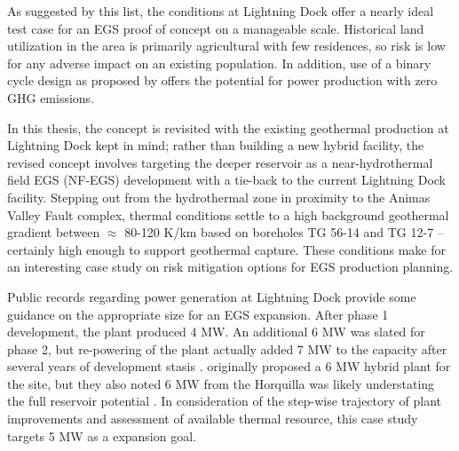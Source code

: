 As suggested by this list, the conditions at Lightning Dock offer a nearly ideal test case for an EGS proof of concept on a manageable scale. Historical land utilization in the area is primarily agricultural with few residences, so risk is low for any adverse impact on an existing population. In addition, use of a binary cycle design as proposed by \citet{schochet_development_2001} offers the potential for power production with zero GHG emissions.  

In this thesis, the \citeauthor{schochet_development_2001} concept is revisited with the existing geothermal production at Lightning Dock kept in mind; rather than building a new hybrid facility, the revised concept involves targeting the deeper reservoir as a near-hydrothermal field EGS (NF-EGS) development with a tie-back to the current Lightning Dock facility. Stepping out from the hydrothermal zone in proximity to the Animas Valley Fault complex, thermal conditions settle to a high background geothermal gradient between $\approx$ 80-120 K/km based on boreholes TG 56-14 and TG 12-7 \citep{cunniff_final_2003} -- certainly high enough to support geothermal capture. These conditions make for an interesting case study on risk mitigation options for EGS production planning.

Public records regarding power generation at Lightning Dock provide some guidance on the appropriate size for an EGS expansion. After phase 1 development, the plant produced 4 MW. An additional 6 MW was slated for phase 2, but re-powering of the plant actually added 7 MW to the capacity after several years of development stasis \citep{think_geoenergy_turboden_2020}. \citeauthor{schochet_development_2001} originally proposed a 6 MW hybrid plant for the site, but they also noted 6 MW from the Horquilla was likely understating the full reservoir potential \citeyear{schochet_development_2001}. In consideration of the step-wise trajectory of plant improvements and assessment of available thermal resource, this case study targets 5 MW as a expansion goal. 


